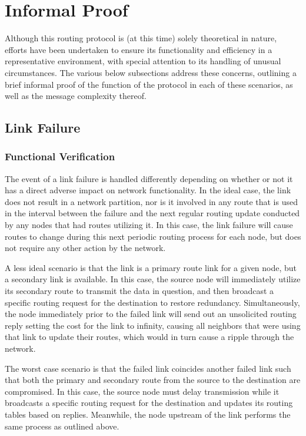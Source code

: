 \section{Informal Proof}\label{sec:informalProof}
Although this routing protocol is (at this time) solely theoretical in nature, efforts have been undertaken to ensure its functionality and efficiency in a representative environment, with special attention to its handling of unusual circumstances. The various below subsections address these concerns, outlining a brief informal proof of the function of the protocol in each of these scenarios, as well as the message complexity thereof.
\subsection{Link Failure}\label{subsec:IPLinkFailure}
\subsubsection{Functional Verification}
The event of a link failure is handled differently depending on whether or not it has a direct adverse impact on network functionality. In the ideal case, the link does not result in a network partition, nor is it involved in any route that is used in the interval between the failure and the next regular routing update conducted by any nodes that had routes utilizing it. In this case, the link failure will cause routes to change during this next periodic routing process for each node, but does not require any other action by the network.

A less ideal scenario is that the link is a primary route link for a given node, but a secondary link is available. In this case, the source node will immediately utilize its secondary route to transmit the data in question, and then broadcast a specific routing request for the destination to restore redundancy. Simultaneously, the node immediately prior to the failed link will send out an unsolicited routing reply setting the cost for the link to infinity, causing all neighbors that were using that link to update their routes, which would in turn cause a ripple through the network.

The worst case scenario is that the failed link coincides another failed link such that both the primary and secondary route from the source to the destination are compromised. In this case, the source node must delay transmission while it broadcasts a specific routing request for the destination and updates its routing tables based on replies. Meanwhile, the node upstream of the link performs the same process as outlined above.
